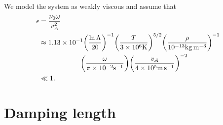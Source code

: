 We model the system as weakly viscous and assume that
\begin{equation}
\begin{aligned}
    \epsilon &= \frac{\nu_0 \omega}{v_A^2} \\
    &\approx 1.13\times10^{-1}\qty(\frac{\ln\Lambda}{20})^{-1}\qty(\frac{T}{3\times 10^6\si{.K}})^{5/2}\qty(\frac{\rho}{10^{-13}\si{.kg.m^{-3}}})^{-1} \\
    & \qquad\qquad\qquad\qty(\frac{\omega}{\pi\times10^{-2}\si{.s^{-1}}})\qty(\frac{v_A}{4\times10^5\si{.m.s^{-1}}})^{-2} \\
    &\ll 1.
\end{aligned}
\end{equation}

\section{Damping length}

